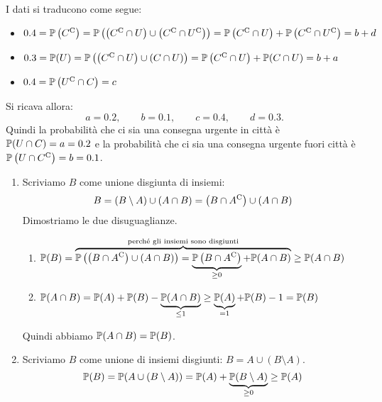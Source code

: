 I dati si traducono come segue:
\begin{itemize}
	\item $0.4=\mathbb{P}\left(C^{\mathrm{C}}\right) =\mathbb{P}\left(\left(C^{\mathrm{C}} \cap U\right) \cup \left(C^{\mathrm{C}} \cap U^{\mathrm{C}}\right)\right)=\mathbb{P}\left(C^{\mathrm{C}} \cap U\right) +\mathbb{P}\left(C^{\mathrm{C}} \cap U^{\mathrm{C}}\right)=b+d$
	\item $0.3=\mathbb{P}(U) =\mathbb{P}\left(\left(C^{\mathrm{C}} \cap U\right) \cup (C\cap U)\right)=\mathbb{P}\left(C^{\mathrm{C}} \cap U\right) +\mathbb{P}(C\cap U)=b+a$
	\item $0.4=\mathbb{P}\left(U^{\mathrm{C}} \cap C\right) =c$
\end{itemize}

Si ricava allora:
\begin{equation*}
	a=0.2,\qquad b=0.1,\qquad c=0.4,\qquad d=0.3.
\end{equation*}
Quindi la probabilità che ci sia una consegna urgente in città è $\mathbb{P}(U\cap C) =a=0.2$ e la probabilità che ci sia una consegna urgente fuori città è $\mathbb{P}\left(U\cap C^{\mathrm{C}}\right) =b=0.1$.

\Soluzione

\begin{enumerate}
	\item Scriviamo $B$ come unione disgiunta di insiemi:
	\[
		B=(B\setminus A) \cup (A\cap B) =\left(B\cap A^{\mathrm{C}}\right) \cup (A\cap B)
	\]
	Dimostriamo le due disuguaglianze.
	\begin{enumerate}
		\item $\mathbb{P}(B) =\overbrace{\mathbb{P}\left(\left(B\cap A^{\mathrm{C}}\right) \cup (A\cap B)\right) =\underbrace{\mathbb{P}\left(B\cap A^{\mathrm{C}}\right)}_{\geq 0} +\mathbb{P}(A\cap B)}^{\text{perché gli insiemi sono disgiunti}} \geq \mathbb{P}(A\cap B)$
		\item $\mathbb{P}(A\cap B) =\mathbb{P}(A) +\mathbb{P}(B) -\underbrace{\mathbb{P}(A\cap B)}_{\leq 1} \geq \underbrace{\mathbb{P}(A)}_{=1} +\mathbb{P}(B) -1=\mathbb{P}(B)$
	\end{enumerate}
	Quindi abbiamo $\mathbb{P}(A\cap B) =\mathbb{P}(B)$.
	\item Scriviamo $B$ come unione di insiemi disgiunti: $B=A\cup (B\setminus A)$.
	\[
		\mathbb{P}(B) =\mathbb{P}(A\cup (B\setminus A)) =\mathbb{P}(A) +\underbrace{\mathbb{P}(B\setminus A)}_{\geq 0} \geq \mathbb{P}(A)
	\]
\end{enumerate}

\Soluzione

